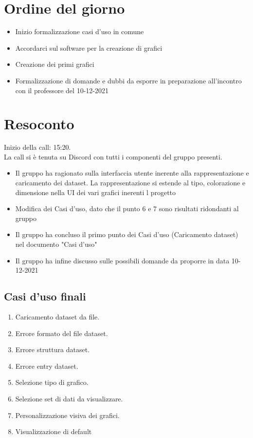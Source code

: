 \section{Ordine del giorno}

\begin{itemize}
	\item Inizio formalizzazione casi d'uso in comune
	\item Accordarci sul software per la creazione di grafici
	\item Creazione dei primi grafici
	\item Formalizzazione di domande e dubbi da esporre in preparazione all'incontro con il professore del 10-12-2021
\end{itemize}

\section{Resoconto}

\noindent 
Inizio della call: 15:20. \\
\noindent La call si è tenuta su Discord con tutti i componenti del gruppo presenti.
\begin{itemize}
	\item Il gruppo ha ragionato sulla interfaccia utente inerente alla rappresentazione e caricamento dei dataset. La rappresentazione si estende al tipo, colorazione e dimensione nella UI dei vari grafici inerenti l progetto
	\item Modifica dei Casi d'uso, dato che il punto 6 e 7 sono risultati ridondanti al gruppo
	\item Il gruppo ha concluso il primo punto dei Casi d'uso (Caricamento dataset) nel documento "Casi d'uso"
	\item Il gruppo ha infine discusso sulle possibili domande da proporre in data 10-12-2021
\end{itemize}

\subsection{Casi d'uso finali}
\begin{enumerate}
	\item Caricamento dataset da file.
	\item Errore formato del file dataset.
	\item Errore struttura dataset.
	\item Errore entry dataset.
	\item Selezione tipo di grafico.
	\item Selezione set di dati da visualizzare.
	\item Personalizzazione visiva dei grafici.
	\item Visualizzazione di default
\end{enumerate}


